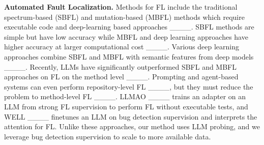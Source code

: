 \textbf{Automated Fault Localization.}
Methods for FL include the traditional spectrum-based (SBFL) and mutation-based (MBFL) methods which require executable code and deep-learning based approaches ____. SBFL methods are simple but have low accuracy while MBFL and deep learning approaches have higher accuracy at larger computational cost ____. Various deep learning approaches combine SBFL and MBFL with semantic features from deep models ____. Recently, LLMs have significantly outperformed SBFL and MBFL approaches on FL on the method level ____. Prompting and agent-based systems can even perform repository-level FL ____, but they must reduce the problem to method-level FL ____. LLMAO ____ trains an adapter on an LLM from strong FL supervision to perform FL without executable tests, and WELL ____ finetunes an LLM on bug detection supervision and interprets the attention for FL.
Unlike these approaches, our method uses LLM probing, and we leverage bug detection supervision to scale to more available data.


